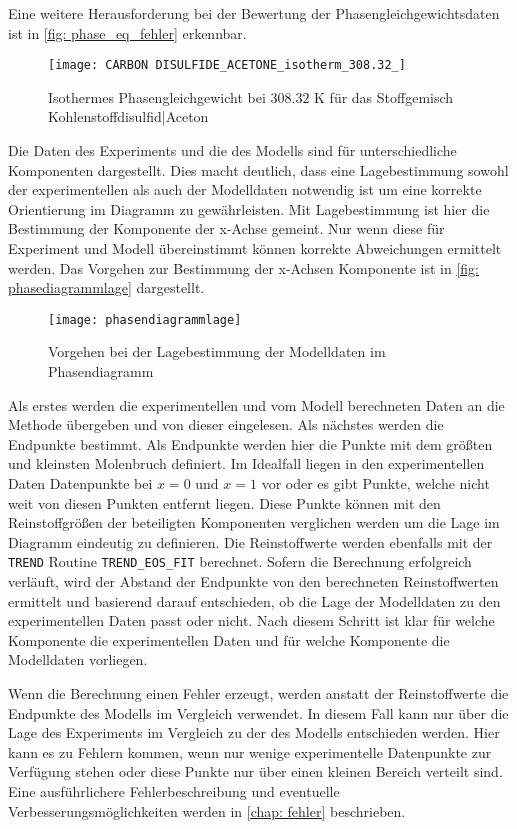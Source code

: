 \documentclass[../thesis.tex]{subfiles}
\begin{document}
Eine weitere Herausforderung bei der Bewertung der Phasengleichgewichtsdaten ist in \autoref{fig: phase_eq_fehler} erkennbar. 

\begin{figure}[htb]
	\centering
	\texttt{[image: CARBON DISULFIDE\_ACETONE\_isotherm\_308.32\_]}
	\caption{Isothermes Phasengleichgewicht bei $ 308$.$32$ K für das Stoffgemisch Kohlenstoffdisulfid|Aceton}
	\label{fig: phase_eq_fehler}
\end{figure}

Die Daten des Experiments und die des Modells sind für unterschiedliche Komponenten dargestellt. Dies macht deutlich, dass eine Lagebestimmung sowohl der experimentellen als auch der Modelldaten notwendig ist um eine korrekte Orientierung im Diagramm zu gewährleisten. Mit Lagebestimmung ist hier die Bestimmung der Komponente der x-Achse gemeint. Nur wenn diese für Experiment und Modell übereinstimmt können korrekte Abweichungen ermittelt werden. Das Vorgehen zur Bestimmung der x-Achsen Komponente ist in \autoref{fig: phasediagrammlage} dargestellt.

\begin{figure}[htb]
	\centering
	\texttt{[image: phasendiagrammlage]}
	\caption{Vorgehen bei der Lagebestimmung der Modelldaten im Phasendiagramm}
	\label{fig: phasediagrammlage}
\end{figure}

Als erstes werden die experimentellen und vom Modell berechneten Daten an die Methode übergeben und von dieser eingelesen. Als nächstes werden die Endpunkte bestimmt. Als Endpunkte werden hier die Punkte mit dem größten und kleinsten Molenbruch definiert. Im Idealfall liegen in den experimentellen Daten Datenpunkte bei $x = 0$ und $ x = 1$ vor oder es gibt Punkte, welche nicht weit von diesen Punkten entfernt liegen. Diese Punkte können mit den Reinstoffgrößen der beteiligten Komponenten verglichen werden um die Lage im Diagramm eindeutig zu definieren. Die Reinstoffwerte werden ebenfalls mit der \texttt{TREND} Routine \texttt{TREND\_EOS\_FIT} berechnet. Sofern die Berechnung erfolgreich verläuft, wird der Abstand der Endpunkte von den berechneten Reinstoffwerten ermittelt und basierend darauf entschieden, ob die Lage der  Modelldaten zu den experimentellen Daten passt oder nicht. Nach diesem Schritt ist klar für welche Komponente die experimentellen Daten und für welche Komponente die Modelldaten vorliegen. 

Wenn die Berechnung einen Fehler erzeugt, werden anstatt der Reinstoffwerte die Endpunkte des Modells im Vergleich verwendet. In diesem Fall kann nur über die Lage des Experiments im Vergleich zu der des Modells entschieden werden. Hier kann es zu Fehlern kommen, wenn nur wenige experimentelle Datenpunkte zur Verfügung stehen oder diese Punkte nur über einen kleinen Bereich verteilt sind. Eine ausführlichere Fehlerbeschreibung und eventuelle Verbesserungsmöglichkeiten werden in \autoref{chap: fehler} beschrieben. 
\end{document}
